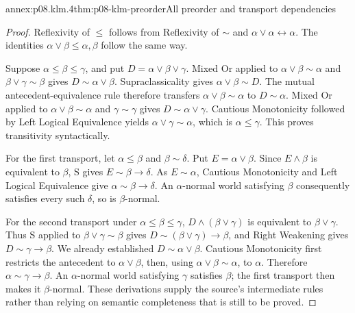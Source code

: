\begin{annexitem}{annex:p08.klm.4}{thm:p08-klm-preorder}{All preorder and transport dependencies}
\begin{proof}
Reflexivity of \(\leq\) follows from Reflexivity of \(\sim\) and
\(\alpha\vee\alpha\leftrightarrow\alpha\). The identities
\(\alpha\vee\beta\leq\alpha,\beta\) follow the same way.

Suppose \(\alpha\leq\beta\leq\gamma\), and put
\(D=\alpha\vee\beta\vee\gamma\). Mixed Or applied to
\(\alpha\vee\beta\sim\alpha\) and
\(\beta\vee\gamma\sim\beta\) gives
\(D\sim\alpha\vee\beta\).
Supraclassicality gives \(\alpha\vee\beta\sim D\). The mutual
antecedent-equivalence rule therefore transfers
\(\alpha\vee\beta\sim\alpha\) to \(D\sim\alpha\).
Mixed Or applied to \(\alpha\vee\beta\sim\alpha\) and
\(\gamma\sim\gamma\) gives \(D\sim\alpha\vee\gamma\).
Cautious Monotonicity followed by Left Logical Equivalence yields
\(\alpha\vee\gamma\sim\alpha\), which is
\(\alpha\leq\gamma\). This proves transitivity syntactically.

For the first transport, let \(\alpha\leq\beta\) and
\(\beta\sim\delta\). Put \(E=\alpha\vee\beta\).
Since \(E\wedge\beta\) is equivalent to \(\beta\), S gives
\(E\sim\beta\to\delta\). As \(E\sim\alpha\), Cautious
Monotonicity and Left Logical Equivalence give
\(\alpha\sim\beta\to\delta\). An \(\alpha\)-normal world
satisfying \(\beta\) consequently satisfies every such \(\delta\),
so is \(\beta\)-normal.

For the second transport under \(\alpha\leq\beta\leq\gamma\),
\(D\wedge(\beta\vee\gamma)\) is equivalent to \(\beta\vee\gamma\).
Thus S applied to \(\beta\vee\gamma\sim\beta\) gives
\(D\sim(\beta\vee\gamma)\to\beta\), and Right Weakening gives
\(D\sim\gamma\to\beta\). We already established
\(D\sim\alpha\vee\beta\). Cautious Monotonicity first restricts
the antecedent to \(\alpha\vee\beta\), then, using
\(\alpha\vee\beta\sim\alpha\), to \(\alpha\). Therefore
\(\alpha\sim\gamma\to\beta\). An \(\alpha\)-normal world
satisfying \(\gamma\) satisfies \(\beta\); the first transport
then makes it \(\beta\)-normal. These derivations supply the
source's intermediate rules rather than relying on semantic completeness
that is still to be proved.
\end{proof}
\end{annexitem}

